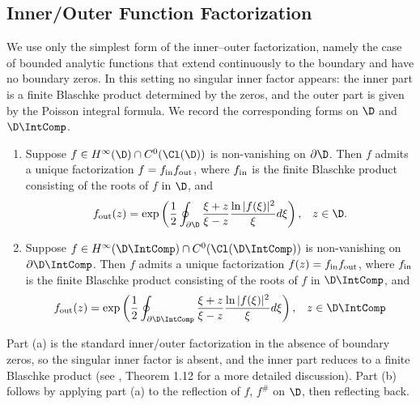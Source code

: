 \documentclass{article}
\numberwithin{equation}{section}
\begin{document}
\subsection{Inner/Outer Function Factorization}\label{subsec:InnerOuterFactorization}
We use only the simplest form of the inner–outer factorization, namely the case of bounded analytic functions that extend continuously to the boundary and have no boundary zeros. In this setting no singular inner factor appears: the inner part is a finite Blaschke product determined by the zeros, and the outer part is given by the Poisson integral formula. We record the corresponding forms on $\D$ and $\D\IntComp$.

\begin{lemma}\label{lemma:InnerOuterFactorization}\;
\begin{enumerate}[label=(\alph*)]
    \item Suppose $f\in H^\infty(\D)\cap C^0(\Cl(\D))$ is non-vanishing on $\partial\D$. Then $f$ admits a unique factorization $f=f_{\rm in}f_{\rm out}$, where $f_{\rm in}$ is the finite Blaschke product consisting of the roots of $f$ in $\D$, and
    \begin{equation}\label{eqn:InnerOuterFactorizationOuterFormula}
    f_{\rm out}(z)=\exp\left(\dfrac{1}{2}\oint_{\partial\D}\dfrac{\xi+z}{\xi-z}\dfrac{\ln|f(\xi)|^2}{\xi}d\xi\right),\;\;\;z\in\D.
\end{equation}
    \item Suppose $f\in H^\infty(\D\IntComp)\cap C^0(\Cl(\D\IntComp))$ is non-vanishing on $\partial\D\IntComp$. Then $f$ admits a unique factorization $f(z)=f_{\rm in}f_{\rm out}$, where $f_{\rm in}$ is the finite Blaschke product consisting of the roots of $f$ in $\D\IntComp$, and
    \begin{equation}\label{eqn:InnerOuterFactorizationOuterFormulaUnbounded}
    f_{\rm out}(z)=\exp\left(\dfrac{1}{2}\oint_{\partial\D\IntComp}\dfrac{\xi+z}{\xi-z}\dfrac{\ln|f(\xi)|^2}{\xi}d\xi\right),\;\;\;z\in\D\IntComp
    \end{equation}
\end{enumerate}
\end{lemma}
Part (a) is the standard inner/outer factorization in the absence of boundary zeros, so the singular inner factor is absent, and the inner part reduces to a finite Blaschke product (see \cite{MashreghiInnnerFunctions2013}, Theorem 1.12 for a more detailed discussion). Part (b) follows by applying part (a) to the reflection of $f$, $f^{\#}$ on $\D$, then reflecting back.\\
\end{document}
